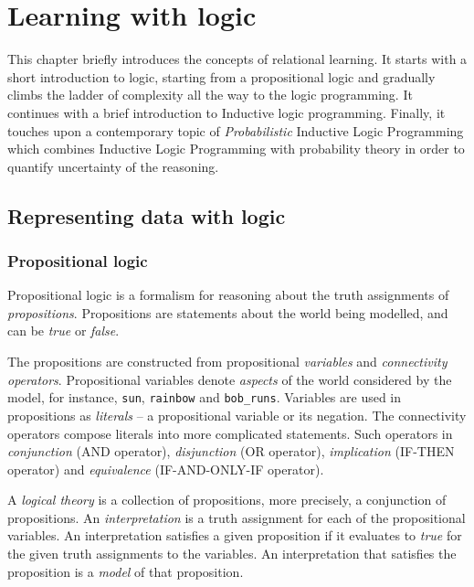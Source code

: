 \chapter{Learning with logic}\label{ch:learninglogic}



This chapter briefly introduces the concepts of relational learning.
It starts with a short introduction to logic, starting from a propositional logic and gradually climbs the ladder of complexity all the way to the logic programming.
It continues with a brief introduction to Inductive logic programming.
Finally, it touches upon a contemporary topic of \textit{Probabilistic} Inductive Logic Programming which combines Inductive Logic Programming  with probability theory in order to quantify uncertainty of the reasoning.




\section{Representing data with logic}





\subsection{Propositional logic}

Propositional logic is a formalism for reasoning about the truth assignments of \textit{propositions}.
Propositions are statements about the world being modelled, and can be \textit{true} or \textit{false}.


The propositions are constructed from propositional \textit{variables} and \textit{connectivity operators}.
Propositional variables denote \textit{aspects} of the world considered by the model, for instance, \texttt{sun}, \texttt{rainbow} and \texttt{bob\_runs}.
Variables are used in propositions as \textit{literals} -- a propositional variable or its negation.
The connectivity operators compose literals into more complicated statements.
Such operators in \textit{conjunction} (AND operator), \textit{disjunction} (OR operator), \textit{implication} (IF-THEN operator) and \textit{equivalence} (IF-AND-ONLY-IF	operator).


A \textit{logical theory} is a collection of propositions, more precisely, a conjunction of propositions.
An \textit{interpretation} is a truth assignment for each of the propositional variables.
An interpretation satisfies a given proposition if it evaluates to \textit{true} for the given truth assignments to the variables.
An interpretation that satisfies the proposition is a \textit{model} of that proposition.




